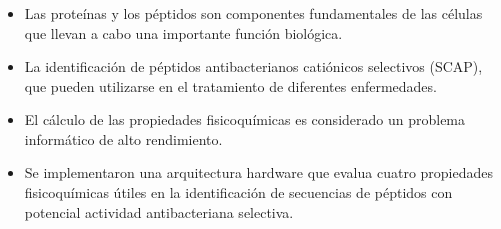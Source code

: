
\frame
{
\frametitle{}

\begin{itemize}
\item Las proteínas y los péptidos son componentes fundamentales de las células que llevan a cabo una importante función biológica.

\item La identificación de péptidos antibacterianos catiónicos selectivos (SCAP), que pueden utilizarse en el tratamiento de diferentes enfermedades.

\item El cálculo de las propiedades fisicoquímicas es considerado un problema informático de alto rendimiento.

\item Se implementaron una arquitectura hardware que evalua cuatro propiedades fisicoquímicas útiles en la identificación de secuencias de péptidos con potencial actividad antibacteriana selectiva.
\end{itemize}

}

